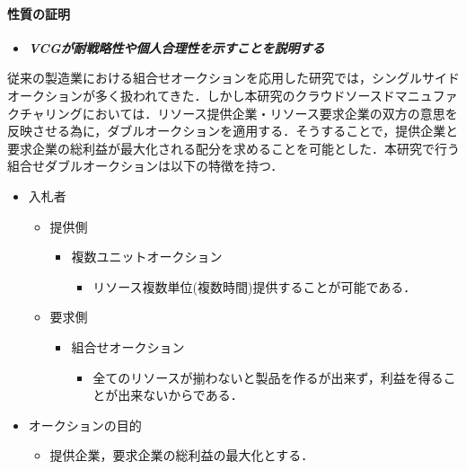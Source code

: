\hypertarget{ux6027ux8ceaux306eux8a3cux660e}{%
\paragraph{性質の証明}\label{ux6027ux8ceaux306eux8a3cux660e}}

\begin{itemize}
\tightlist
\item
  \textbf{\emph{VCGが耐戦略性や個人合理性を示すことを説明する}}
\end{itemize}

従来の製造業における組合せオークションを応用した研究では，シングルサイドオークションが多く扱われてきた\cite{suginouchi}．しかし本研究のクラウドソースドマニュファクチャリングにおいては．リソース提供企業・リソース要求企業の双方の意思を反映させる為に，ダブルオークションを適用する．そうすることで，提供企業と要求企業の総利益が最大化される配分を求めることを可能とした．本研究で行う組合せダブルオークションは以下の特徴を持つ．

\begin{itemize}
\tightlist
\item
  入札者

  \begin{itemize}
  \tightlist
  \item
    提供側

    \begin{itemize}
    \tightlist
    \item
      複数ユニットオークション

      \begin{itemize}
      \tightlist
      \item
        リソース複数単位(複数時間)提供することが可能である．
      \end{itemize}
    \end{itemize}
  \item
    要求側

    \begin{itemize}
    \tightlist
    \item
      組合せオークション

      \begin{itemize}
      \tightlist
      \item
        全てのリソースが揃わないと製品を作るが出来ず，利益を得ることが出来ないからである．
      \end{itemize}
    \end{itemize}
  \end{itemize}
\item
  オークションの目的

  \begin{itemize}
  \tightlist
  \item
    提供企業，要求企業の総利益の最大化とする．
  \end{itemize}
\end{itemize}


